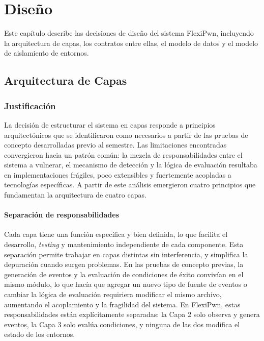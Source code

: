 \chapter{Diseño}
\label{sec:diseño}

Este capítulo describe las decisiones de diseño del sistema FlexiPwn, incluyendo
la arquitectura de capas, los contratos entre ellas, el modelo de datos y el
modelo de aislamiento de entornos.

\section{Arquitectura de Capas}

\subsection{Justificación}

La decisión de estructurar el sistema en capas responde a principios
arquitectónicos que se identificaron como necesarios a partir de las pruebas de
concepto desarrolladas previo al semestre. Las limitaciones encontradas
convergieron hacia un patrón común: la mezcla de responsabilidades entre el
sistema a vulnerar, el mecanismo de detección y la lógica de evaluación
resultaba en implementaciones frágiles, poco extensibles y fuertemente acopladas
a tecnologías específicas. A partir de este análisis emergieron cuatro
principios que fundamentan la arquitectura de cuatro capas.

\subsubsection*{Separación de responsabilidades}

Cada capa tiene una función específica y bien definida, lo que facilita el
desarrollo, \textit{testing} y mantenimiento independiente de cada componente.
Esta separación permite trabajar en capas distintas sin interferencia, y
simplifica la depuración cuando surgen problemas. En las pruebas de concepto
previas, la generación de eventos y la evaluación de condiciones de éxito
convivían en el mismo módulo, lo que hacía que agregar un nuevo tipo de fuente
de eventos o cambiar la lógica de evaluación requiriera modificar el mismo
archivo, aumentando el acoplamiento y la fragilidad del sistema. En FlexiPwn,
estas responsabilidades están explícitamente separadas: la Capa 2 solo observa y
genera eventos, la Capa 3 solo evalúa condiciones, y ninguna de las dos modifica
el estado de los entornos.

